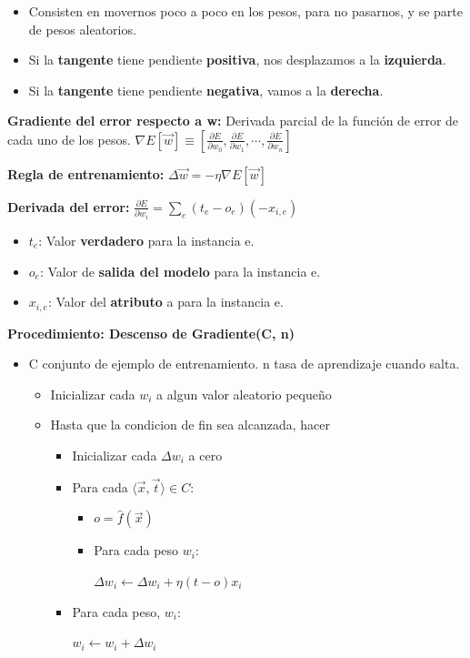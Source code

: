 \documentclass[12pt, twoside, openright]{report} %
\begin{document}
\begin{itemize}
	\item Consisten en movernos poco a poco en los pesos, para no pasarnos, y se parte de pesos aleatorios.
	\item Si la \textbf{tangente} tiene pendiente \textbf{positiva}, nos
	      desplazamos a la \textbf{izquierda}.
	\item Si la \textbf{tangente} tiene pendiente \textbf{negativa}, vamos a la
	      \textbf{derecha}.
\end{itemize}

\textbf{Gradiente del error respecto a w:} Derivada parcial de la
función de error de cada uno de los pesos.
\(\nabla E[\vec{w}] \equiv\left[\frac{\partial E}{\partial w_{0}}, \frac{\partial E}{\partial w_{1}}, \cdots ,\frac{\partial E}{\partial w_{n}}\right]\)

\textbf{Regla de entrenamiento:}
\(\Delta \vec{w}=-\eta \nabla E[\vec{w}]\)

\textbf{Derivada del error:}
\(\frac{\partial E}{\partial w_{i}}=\sum_{e}\left(t_{e}-o_{e}\right)\left(-x_{i, e}\right)\)

\begin{itemize}
	\item \(t_e\): Valor \textbf{verdadero} para la instancia e.
	\item \(o_e\): Valor de \textbf{salida del modelo} para la instancia e.
	\item \(x_{i,e}\): Valor del \textbf{atributo} a para la instancia e.
\end{itemize}
\pagebreak
\textbf{Procedimiento: Descenso de Gradiente(C, n)}

\begin{itemize}
	\item C conjunto de ejemplo de entrenamiento. n tasa de aprendizaje cuando
	      salta.
		  \begin{itemize}
			  \item Inicializar cada $w_i$ a algun valor aleatorio pequeño
			  \item Hasta que la condicion de fin sea alcanzada, hacer
			  \begin{itemize}
				  \item Inicializar cada $\Delta w_i$ a cero
				  \item Para cada $\langle \vec{x}, \vec{t} \rangle \in C $:
				  \begin{itemize}
					  \item $o = \hat{f}(\vec{x})$
				      \item Para cada peso $w_i$:
						
				      $\Delta w_i \leftarrow \Delta w_i + \eta (t - o)x_i$
				  \end{itemize}

				  \item Para cada peso, $w_i$:
                  
				  $w_i \leftarrow w_i + \Delta w_i$
			  \end{itemize}
		  \end{itemize}	  
\end{itemize}
\end{document}
